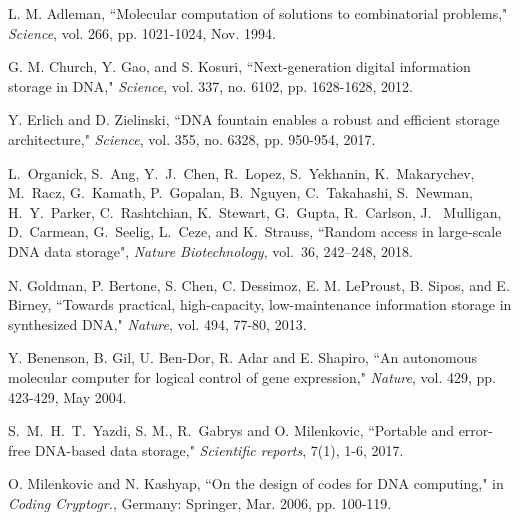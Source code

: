 \documentclass[conference]{IEEEtran}
\theoremstyle{plain}
\theoremstyle{definition}
\begin{document}
\label{sec:biblio}
\begin{thebibliography}{99}

 L. M. Adleman, ``Molecular computation of solutions to combinatorial problems," {\em Science}, vol. 266, pp. 1021-1024, Nov. 1994.

 G. M. Church, Y. Gao, and S. Kosuri, ``Next-generation digital information storage in DNA," {\em Science}, vol. 337, no. 6102, pp. 1628-1628, 2012.

 Y. Erlich and D. Zielinski, ``DNA fountain enables a robust and efficient storage architecture," {\em Science}, vol. 355, no. 6328, pp. 950-954, 2017.


L.~Organick, S.~Ang, Y.~J.~Chen, R.~Lopez, S.~Yekhanin, K.~Makarychev, M.~Racz, G.~Kamath, P.~Gopalan, B.~Nguyen, C.~Takahashi, S.~Newman, H.~Y.~Parker, C.~Rashtchian, K.~Stewart, G.~Gupta, R.~Carlson, J.~ Mulligan, D.~Carmean, G.~Seelig, L.~Ceze, and K.~Strauss,
``Random access in large-scale {DNA} data storage",
\emph{Nature Biotechnology},
vol.~36, 242--248, 2018.

 N. Goldman, P. Bertone, S. Chen, C. Dessimoz, E. M. LeProust, B. Sipos, and E. Birney, ``Towards practical, high-capacity, low-maintenance information storage in synthesized DNA," {\em Nature}, vol. 494, 77-80, 2013.



 Y. Benenson, B. Gil, U. Ben-Dor, R. Adar and E. Shapiro, ``An autonomous molecular computer for logical control of gene expression," {\em Nature}, vol. 429, pp. 423-429, May 2004.

S.~M.~H.~T.~Yazdi, S. M., R.~Gabrys and O. Milenkovic, ``Portable and error-free DNA-based data storage," 
{\em Scientific reports}, 7(1), 1-6, 2017.


 O. Milenkovic and N. Kashyap, ``On the design of codes for DNA computing," in {\em Coding Cryptogr.}, Germany: Springer, Mar. 2006, pp. 100-119.


\end{thebibliography}
\end{document}
